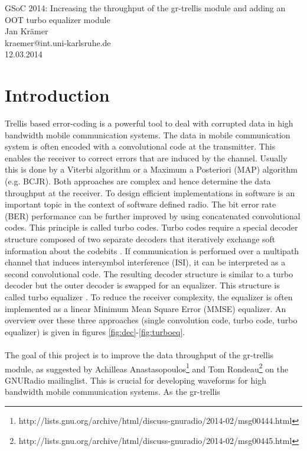 \documentclass[11pt,		%
	    DIV12,		%
	    a4paper,		%
	    final,		%
	    halfparskip,	%
	    ]{scrartcl}		%
\begin{document}
\begin{center}
{\huge GSoC 2014: Increasing the throughput of the gr-trellis module and adding an OOT turbo equalizer module}\\[1cm]
{Jan Krämer}\\[0.25cm]
{kraemer@int.uni-karlsruhe.de}\\[0.5cm]
{12.03.2014}\\[0.5cm]
\end{center}
\tableofcontents 
\newpage
\section{Introduction}
Trellis based error-coding is a powerful tool to deal with corrupted data in high bandwidth mobile communication systems. The data in mobile communication system is often encoded with a convolutional code at the transmitter. This enables the receiver to correct errors that are induced by the channel. Usually this is done by a Viterbi algorithm or a Maximum a Posteriori (MAP) algorithm (e.g. BCJR). Both approaches are complex and hence determine the data throughput at the receiver. To design efficient implementations in software is an important topic in the context of software defined radio. The bit error rate (BER) performance can be further improved by using concatenated convolutional codes. This principle is called turbo codes. Turbo codes require a special decoder structure composed of two separate decoders that iteratively exchange soft information about the codebits \cite{tc02}. If communication is performed over a multipath channel that induces intersymbol interference (ISI), it can be interpreted as a second convolutional code. The resulting decoder structure is similar to a turbo decoder but the outer decoder is swapped for an equalizer. This structure is called turbo equalizer \cite{te02}. To reduce the receiver complexity, the equalizer is often implemented as a linear Minimum Mean Square Error (MMSE) equalizer. An overview over these three approaches (single convolution code, turbo code, turbo equalizer) is given in figures \ref{fig:dec}-\ref{fig:turboeq}.\\ \\ The goal of this project is to improve the data throughput of the gr-trellis module, as suggested by Achilleas Anastasopoulos\footnote[1]{http://lists.gnu.org/archive/html/discuss-gnuradio/2014-02/msg00444.html} and Tom Rondeau\footnote[2]{http://lists.gnu.org/archive/html/discuss-gnuradio/2014-02/msg00445.html} on the GNURadio mailinglist. This is crucial for developing waveforms for high bandwidth mobile communication systems. As the gr-trellis 
\end{document}
